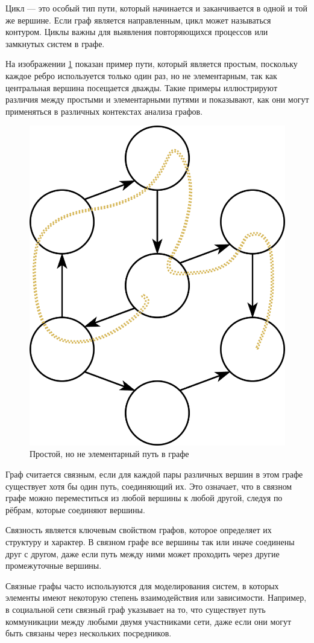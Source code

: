 Цикл — это особый тип пути, который начинается и заканчивается в одной и той же вершине. Если граф является направленным, цикл может называться контуром. Циклы важны для выявления повторяющихся процессов или замкнутых систем в графе.

На изображении \ref{fig:path_example} показан пример пути, который является простым, поскольку каждое ребро используется только один раз, но не элементарным, так как центральная вершина посещается дважды. Такие примеры иллюстрируют различия между простыми и элементарными путями и показывают, как они могут применяться в различных контекстах анализа графов.


\begin{figure}[H]
	\begin{center}
		\includegraphics[width=0.40\linewidth]{src/img/1/graph_path.png}
		\caption{Простой, но не элементарный путь в графе}
		\label{fig:path_example}
	\end{center}
\end{figure}

Граф считается связным, если для каждой пары различных вершин в этом графе существует хотя бы один путь, соединяющий их. Это означает, что в связном графе можно переместиться из любой вершины к любой другой, следуя по рёбрам, которые соединяют вершины.

Связность является ключевым свойством графов, которое определяет их структуру и характер. В связном графе все вершины так или иначе соединены друг с другом, даже если путь между ними может проходить через другие промежуточные вершины.

Связные графы часто используются для моделирования систем, в которых элементы имеют некоторую степень взаимодействия или зависимости. Например, в социальной сети связный граф указывает на то, что существует путь коммуникации между любыми двумя участниками сети, даже если они могут быть связаны через нескольких посредников.

